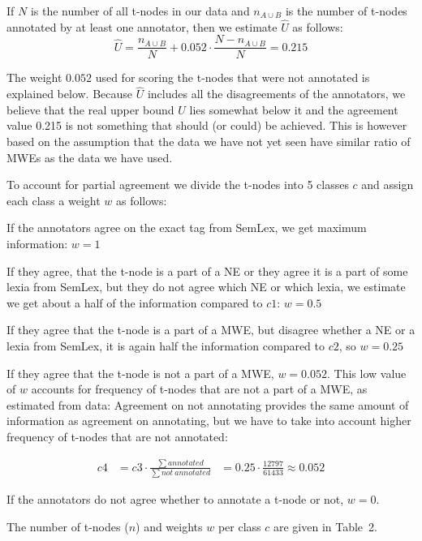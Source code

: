 \documentclass[11pt]{article}
\begin{document}
If $N$ is the number of all t-nodes in our data and $n_{A \cup B}$ is the number of t-nodes annotated by at least one annotator, then we estimate $\widehat{U}$ as follows:
\vspace{-6pt}
\begin{equation}
\label{eq-upper-bound}
\widehat{U} = \frac{n_{A \cup B}}{N} + 0.052 \cdot \frac{N - n_{A \cup B}}{N}= 0.215
\end{equation}
\vspace{-12pt}

The weight $0.052$ used for scoring the t-nodes that were not annotated is explained below. Because $\widehat{U}$ includes all the disagreements of the annotators, we believe that the real upper bound $U$ lies somewhat below it and the agreement value 0.215 is not something that should (or could) be achieved. This is however based on the assumption that the data we have not yet seen have similar ratio of MWEs as the data we have used.

To account for partial agreement we divide the t-nodes into 5 classes $c$ and assign each class a weight $w$ as follows: 

\begin{compactenum}[$c1$]
\item
If the annotators agree on the exact tag from SemLex, we get maximum information: $w = 1$
\item
If they agree, that the t-node is a part of a NE or they agree it is a part of some lexia from SemLex, but they do not agree which NE or which lexia, we estimate we get about a half of the information compared to $c1$: $w = 0.5$
\item
If they agree that the t-node is a part of a MWE, but disagree whether a NE or a lexia from SemLex, it is again half the information compared to $c2$, so $w = 0.25$
\item
If they agree that the t-node is not a part of a MWE, $w = 0.052$. This low value of $w$ accounts for frequency of t-nodes that are not a part of a MWE, as estimated from data: Agreement on not annotating provides the same amount of information as agreement on annotating, but we have to take into account higher frequency of t-nodes that are not annotated: 

\vspace{-10pt}
\begin{small}
  \begin{align*}
  c4 &= c3 \cdot \frac{\sum annotated}{\sum not\ annotated}
       &= 0.25 \cdot \frac{12797}{61433} \approx 0.052
  \end{align*}
  \end{small}
\vspace{-10pt}
\item
If the annotators do not agree whether to annotate a t-node or not, $w = 0$. 
\end{compactenum}
The number of t-nodes ($n$) and weights $w$ per class $c$ are given in Table~2. %
\end{document}
